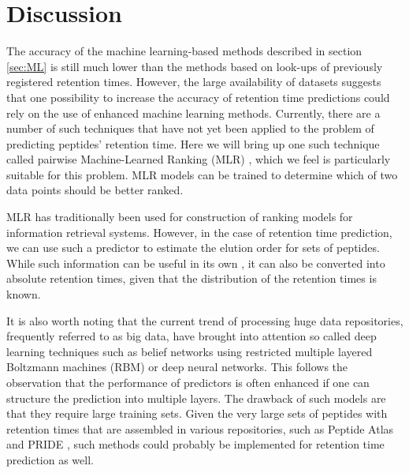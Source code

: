 \documentclass[a4paper]{article}
\begin{document}

\section{Discussion}

The accuracy of the machine learning-based methods described in
section \ref{sec:ML} is still much lower than the methods based on
look-ups of previously registered retention times. However, the large
availability of datasets suggests that one possibility to increase the
accuracy of retention time predictions could rely on the use of
enhanced machine learning methods. Currently, there are a number of
such techniques that have not yet been applied to the problem of
predicting peptides' retention time. Here we will bring up one such
technique called pairwise Machine-Learned Ranking (MLR)
\cite{liu2009learning}, which we feel is particularly suitable for
this problem. MLR models can be trained to determine which of two data
points should be better ranked. 

MLR has traditionally been used for construction of ranking models for
information retrieval systems. However, in the case of retention time
prediction, we can use such a predictor to estimate the elution order
for sets of peptides. While such information can be useful in its own
\cite{bailey2012instant}, it can also be converted into absolute
retention times, given that the distribution of the retention times is
known.

It is also worth noting that the current trend of processing huge data
repositories, frequently referred to as big data, have brought into
attention so called deep learning techniques such as belief networks
using restricted multiple layered Boltzmann machines (RBM)
\cite{salakhutdinov2009deep} or deep neural networks. This follows the
observation that the performance of predictors is often enhanced if
one can structure the prediction into multiple layers. The drawback of
such models are that they require large training sets. Given the very
large sets of peptides with retention times that are assembled in
various repositories, such as Peptide Atlas
\cite{desiere2006peptideatlas} and PRIDE \cite{martens2005pride}, such
methods could probably be implemented for retention time prediction as
well.
\end{document}
